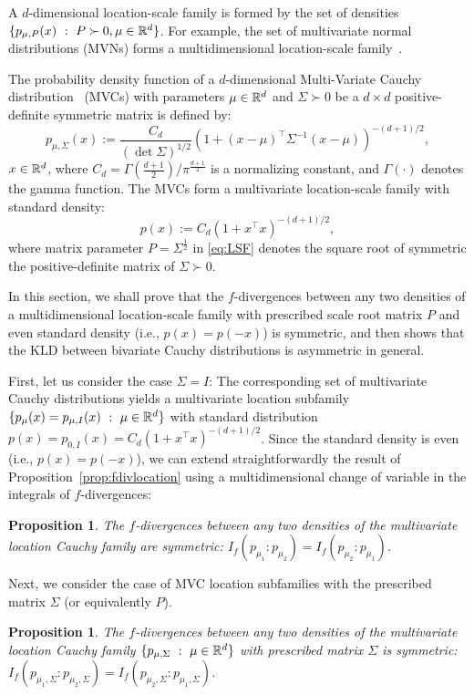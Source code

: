 \documentclass[journal]{IEEEtran}
\newtheorem{proposition}[theorem]{Proposition}
\begin{document}
A $d$-dimensional location-scale family is formed by the set of densities $\{p_{\mu,P}(x)\ :\ P\succ 0, \mu\in{\mathbb{R}}^d\}$.
For example, the set of multivariate normal distributions (MVNs) forms a multidimensional location-scale family~\cite{infproj-2021}.

The probability density function of a $d$-dimensional Multi-Variate Cauchy distribution~\cite{press1972multivariate} (MVCs) with parameters $\mu \in {\mathbb{R}}^d$ and $\Sigma\succ 0$ be a $d\times d$ positive-definite symmetric matrix is defined by:
\begin{equation}\label{eq:density-MVC} 
p_{\mu,\Sigma}(x) := \frac{C_d}{(\det \Sigma)^{1/2}} \left( 1 + \left(x - \mu\right)^{\top} \Sigma^{-1} \left(x-\mu\right) \right)^{-(d+1)/2}, 
\end{equation}
$x \in {\mathbb{R}}^d$, where $C_d = \Gamma\left(\frac{d+1}{2}\right)/\pi^{\frac{d+1}{2}}$ is a normalizing constant, and $\Gamma(\cdot)$ denotes the gamma function.
The MVCs form a multivariate location-scale family with standard density: 
$$
p(x):=C_d \left( 1 + x^\top x \right)^{-(d+1)/2},
$$
where matrix parameter $P=\Sigma^{\frac{1}{2}}$ in \eqref{eq:LSF} denotes the square root of symmetric the  positive-definite matrix of $\Sigma\succ 0$. 
	
In this section, we shall prove that the $f$-divergences between any two densities of a multidimensional location-scale family with prescribed scale root matrix $P$
and even standard density (i.e., $p(x)=p(-x)$) is symmetric, and then shows that the KLD between bivariate Cauchy distributions is asymmetric in general.

First, let us consider the case $\Sigma=I$: The corresponding set of multivariate Cauchy distributions yields a multivariate location subfamily $\{p_{\mu}(x)=p_{\mu,I}(x)\ :\ \mu\in\bbR^d\}$ with standard distribution
$p(x)=p_{0,I}(x) = C_d \left( 1 + x^\top x \right)^{-(d+1)/2}$. 
Since the standard density is even (i.e., $p(x)=p(-x)$), we can extend straightforwardly the result of Proposition~\ref{prop:fdivlocation} using a multidimensional change of variable in the integrals of $f$-divergences:

\begin{proposition}\label{prop:fdivloceven}
The $f$-divergences between any two densities of the multivariate location Cauchy family are symmetric: 
$I_f(p_{\mu_1}:p_{\mu_2})=I_f(p_{\mu_2}:p_{\mu_1})$.
\end{proposition} 

Next, we consider the case of MVC location subfamilies with the prescribed matrix $\Sigma$ (or equivalently $P$).
\begin{proposition}\label{prop:fdivlocSigmaeven}
The $f$-divergences between any two densities of the multivariate location Cauchy family $\{p_{\mu,\Sigma}\ :\ \mu\in{\mathbb{R}}^d\}$ with prescribed matrix $\Sigma$ is symmetric: 
$I_f(p_{\mu_1,\Sigma}:p_{\mu_2,\Sigma})=I_f(p_{\mu_2,\Sigma}:p_{\mu_1,\Sigma})$.
\end{proposition} 
\end{document}
